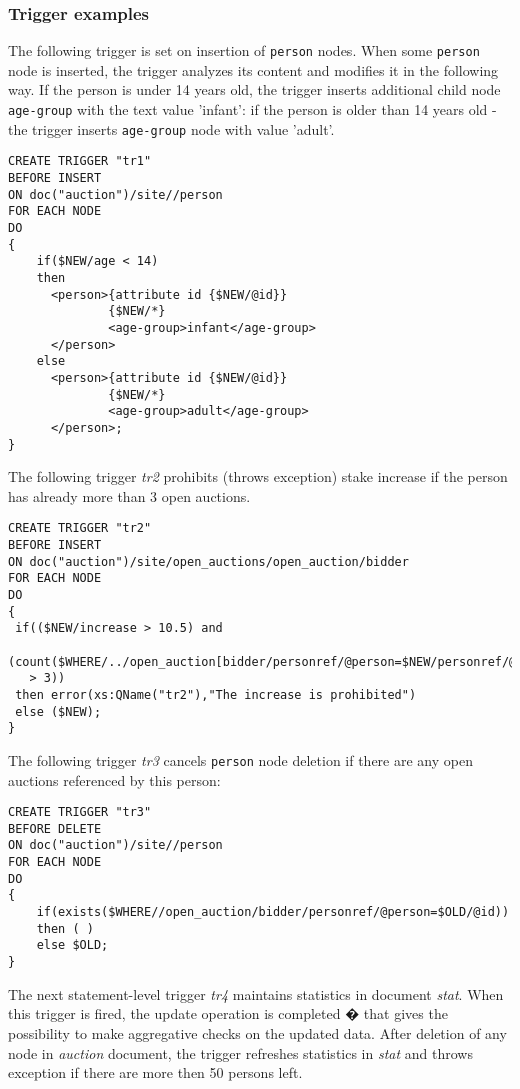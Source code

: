 \documentclass[a4paper,12pt]{article}
\begin{document}
\subsubsection{Trigger examples}

The following trigger is set on insertion of \verb!person! nodes. When some \verb!person! node is inserted, the trigger analyzes its content and modifies it in the following way. If the person is under 14 years old, the trigger inserts additional child node \verb!age-group! with the text value 'infant': if the person is older than 14 years old - the trigger inserts \verb!age-group! node with value 'adult'.

{\footnotesize\begin{verbatim}
CREATE TRIGGER "tr1"
BEFORE INSERT
ON doc("auction")/site//person
FOR EACH NODE
DO
{
	if($NEW/age < 14)
	then
	  <person>{attribute id {$NEW/@id}}
	          {$NEW/*}
	          <age-group>infant</age-group>
	  </person>
	else
	  <person>{attribute id {$NEW/@id}}
	          {$NEW/*}
	          <age-group>adult</age-group>
	  </person>;
}
\end{verbatim}}

The following trigger \emph{tr2} prohibits (throws exception) stake increase if the person has already more than 3 open auctions.
\begin{verbatim}
CREATE TRIGGER "tr2"
BEFORE INSERT
ON doc("auction")/site/open_auctions/open_auction/bidder
FOR EACH NODE
DO
{
 if(($NEW/increase > 10.5) and
  (count($WHERE/../open_auction[bidder/personref/@person=$NEW/personref/@person])
   > 3))
 then error(xs:QName("tr2"),"The increase is prohibited")
 else ($NEW);
}
\end{verbatim}

The following trigger \emph{tr3} cancels \verb!person! node deletion if there are any open auctions referenced by this person:

\begin{verbatim}
CREATE TRIGGER "tr3"
BEFORE DELETE
ON doc("auction")/site//person
FOR EACH NODE
DO
{
	if(exists($WHERE//open_auction/bidder/personref/@person=$OLD/@id))
	then ( )
	else $OLD;
}
\end{verbatim}

The next statement-level trigger \emph{tr4} maintains statistics in document \emph{stat}. When this trigger is fired, the update operation is completed � that gives the possibility to make aggregative checks on the updated data. After deletion of any node in \emph{auction} document, the trigger refreshes statistics in \emph{stat} and throws exception if there are more then 50 persons left.
\end{document}
